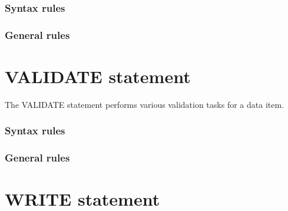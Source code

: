 \begin{syntax}
  \begin{0-1}
  \end{0-1}
    \identifier
\end{syntax}

\begin{syntax}
\end{syntax}

\subsubsection{Syntax rules}

\subsubsection{General rules}

\section{VALIDATE statement}

The VALIDATE statement performs various validation tasks for a data item.

\begin{syntax}
\end{syntax}

\subsubsection{Syntax rules}

\subsubsection{General rules}

\section{WRITE statement}

